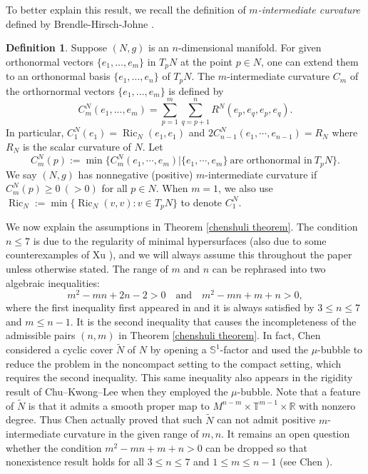 \documentclass[11pt,letterpaper]{amsart}
\DeclareMathOperator{\Ric}{Ric}
\theoremstyle{definition}
\newtheorem{definition}[theorem]{Definition}
\theoremstyle{remark}
\numberwithin{equation}{section}
\begin{document}
To better explain this result, we recall the definition of \textit{$m$-intermediate curvature} defined by Brendle-Hirsch-Johne \cite{brendlegeroch'sconjecture}.

\begin{definition}

    Suppose $(N,g)$ is an $n$-dimensional manifold. For given orthonormal vectors $\{e_{1},...,e_{m}\}$ in $T_pN$ at the point $p\in N$, one can extend them to an orthonormal basis $\{e_{1},...,e_{n}\}$ of $T_{p}N$. 
    The $m$-intermediate curvature $C_{m}$ of the orthornormal vectors $\{e_{1},...,e_{m}\}$ is defined by
    \[
    C^N_{m}(e_{1},...,e_{m}) = \sum_{p=1}^{m}\sum_{q=p+1}^{n}R^N(e_{p},e_{q},e_{p},e_{q}).\]
In particular, $C^N_1(e_1)=\Ric_N(e_1,e_1)$ and $2C^N_{n-1}(e_1,\cdots,e_{n-1})=R_N$ where $R_N$ is the scalar curvature of $N$. Let 
\[C^N_m(p):=\min\{C^N_m(e_1,\cdots,e_m)| \{e_1,\cdots,e_m\}\ \text{are orthonormal in}\ T_pN\}.\]
We say $(N,g)$ has nonnegative (positive) $m$-intermediate curvature if $C^N_m(p)\geq 0\ (>0)$ for all $p\in N.$ When $m=1$, we also use $\Ric_N:=\min\{\Ric_N(v,v):v\in T_pN\}$ to denote $C_1^N.$
\end{definition}

We now explain the assumptions in Theorem \ref{chenshuli theorem}. The condition $n \leq 7$ is due to the regularity of minimal hypersurfaces (also due to some counterexamples of Xu \cite{XuTrans}), and we will always assume this throughout the paper unless otherwise stated. The range of $m$ and $n$ can be rephrased into two algebraic inequalities:
\[
m^2 - mn + 2n - 2 > 0 \quad \text{and} \quad m^2 - mn + m + n > 0,
\]
where the first inequality first appeared in \cite{brendlegeroch'sconjecture} and it is always satisfied by $3\leq n\leq 7$ and $m\leq n-1$. It is the second inequality that causes the incompleteness of the admissible pairs $(n,m)$ in Theorem \ref{chenshuli theorem}. In fact, Chen \cite{chenshuli_end} considered a cyclic cover $\tilde{N}$ of $N$ by opening a $\mathbb{S}^1$-factor and used the $\mu$-bubble to reduce the problem in the noncompact setting to the compact setting, which requires the second inequality. This same inequality also appears in the rigidity result of Chu--Kwong--Lee \cite{ChuKwongLeerigidity} when they employed the $\mu$-bubble. 
Note that a feature of $\tilde{N}$ is that it admits a smooth proper map to $M^{n-m}\times\mathbb{T}^{m-1}\times\mathbb{R}$ with nonzero degree. Thus Chen actually proved that such $\tilde{N}$ can not admit positive $m$-intermediate curvature in the given range of $m,n$. It remains an open question whether the condition $m^2-mn+m+n>0$ can be dropped so that nonexistence result holds for all $3 \leq n \leq 7$ and $1 \leq m \leq n-1$ (see Chen \cite{chenshuli_end}).
\end{document}
